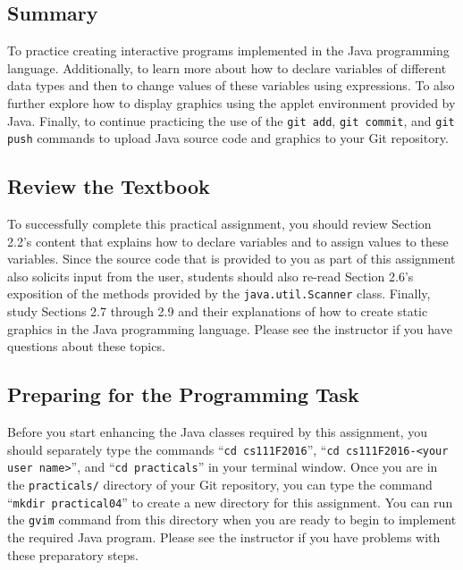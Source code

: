 


\vspace*{-.1in}
\subsection*{Summary}

To practice creating interactive programs implemented in the Java programming language. Additionally, to learn more about
how to declare variables of different data types and then to change values of these variables using expressions.  To
also further explore how to display graphics using the applet environment provided by Java. Finally, to continue
practicing the use of the {\tt git add}, {\tt git commit}, and {\tt git push} commands to upload Java source code and
graphics to your Git repository.

\vspace*{-.1in}
\subsection*{Review the Textbook}

To successfully complete this practical assignment, you should review Section 2.2's content that explains how to declare
variables and to assign values to these variables. Since the source code that is provided to you as part of this
assignment also solicits input from the user, students should also re-read Section 2.6's exposition of the methods
provided by the {\tt java.util.Scanner} class. Finally, study Sections 2.7 through 2.9 and their explanations of how to
create static graphics in the Java programming language.  Please see the instructor if you have questions about these
topics.

\vspace*{-.1in}
\subsection*{Preparing for the Programming Task}

Before you start enhancing the Java classes required by this assignment, you should separately type the commands ``{\tt cd
  cs111F2016}'', ``{\tt cd cs111F2016-<your user name>}'', and ``{\tt cd practicals}'' in your terminal window. Once you
are in the {\tt practicals/} directory of your Git repository, you can type the command ``{\tt mkdir practical04}'' to
create a new directory for this assignment. You can run the {\tt gvim} command from this directory when you are ready to
begin to implement the required Java program. Please see the instructor if you have problems with these preparatory steps.

